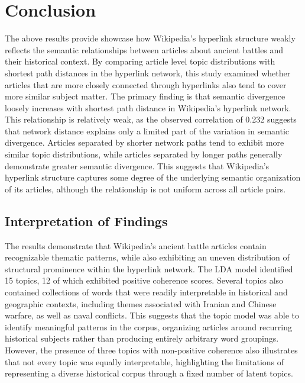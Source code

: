 \documentclass[
  letterpaper,
  DIV=11,
  numbers=noendperiod]{scrartcl}
\begin{document}
\section{Conclusion}\label{conclusion}

The above results provide showcase how Wikipedia's hyperlink structure
weakly reflects the semantic relationships between articles about
ancient battles and their historical context. By comparing article level
topic distributions with shortest path distances in the hyperlink
network, this study examined whether articles that are more closely
connected through hyperlinks also tend to cover more similar subject
matter. The primary finding is that semantic divergence loosely
increases with shortest path distance in Wikipedia's hyperlink network.
This relationship is relatively weak, as the observed correlation of
0.232 suggests that network distance explains only a limited part of the
variation in semantic divergence. Articles separated by shorter network
paths tend to exhibit more similar topic distributions, while articles
separated by longer paths generally demonstrate greater semantic
divergence. This suggests that Wikipedia's hyperlink structure captures
some degree of the underlying semantic organization of its articles,
although the relationship is not uniform across all article pairs.

\subsection{Interpretation of
Findings}\label{interpretation-of-findings}

The results demonstrate that Wikipedia's ancient battle articles contain
recognizable thematic patterns, while also exhibiting an uneven
distribution of structural prominence within the hyperlink network. The
LDA model identified 15 topics, 12 of which exhibited positive coherence
scores. Several topics also contained collections of words that were
readily interpretable in historical and geographic contexts, including
themes associated with Iranian and Chinese warfare, as well as naval
conflicts. This suggests that the topic model was able to identify
meaningful patterns in the corpus, organizing articles around recurring
historical subjects rather than producing entirely arbitrary word
groupings. However, the presence of three topics with non-positive
coherence also illustrates that not every topic was equally
interpretable, highlighting the limitations of representing a diverse
historical corpus through a fixed number of latent topics.
\end{document}
